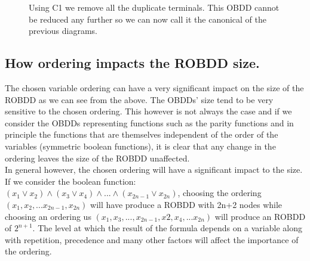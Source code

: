 \documentclass[a4paper]{article}
\begin{document}
\begin{figure}[H]
  \label{fig:robdd24}
  \centering

\caption{Using C1 we remove all the duplicate terminals. This OBDD cannot be reduced any further so we can now call it the canonical of the previous diagrams.}

\end{figure}

\subsection*{How ordering impacts the ROBDD size.}
The chosen variable ordering can have a very significant impact on the size of the ROBDD as we can see from the above. The OBDDs' 
size tend to be very sensitive to the chosen ordering. 
This however is not always the case and if we consider the OBDDs representing functions such as the parity functions and in principle
the functions that are themselves independent of the order of the variables (symmetric boolean functions), it is clear that any change 
in the ordering leaves the size of the ROBDD unaffected. \\[0.25cm]
In general however, the chosen ordering will have a significant impact to the size. If we consider the boolean function:
$(x_1 \vee x_2) \wedge (x_3 \vee x_4) \wedge ... \wedge (x_{2n-1} \vee x_{2n})$, choosing the ordering $(x_1,x_2,...x_{2n-1},x_{2n})$ will
have produce a ROBDD with 2n+2 nodes while choosing an ordering us $(x_1,x_3,...,x_{2n-1},x2,x_4,...x_{2n})$ will produce an ROBDD of $2^{n+1}$.
The level at which the result of the formula depends on a variable along with repetition, precedence and many other factors will affect the importance of the ordering.
\end{document}
